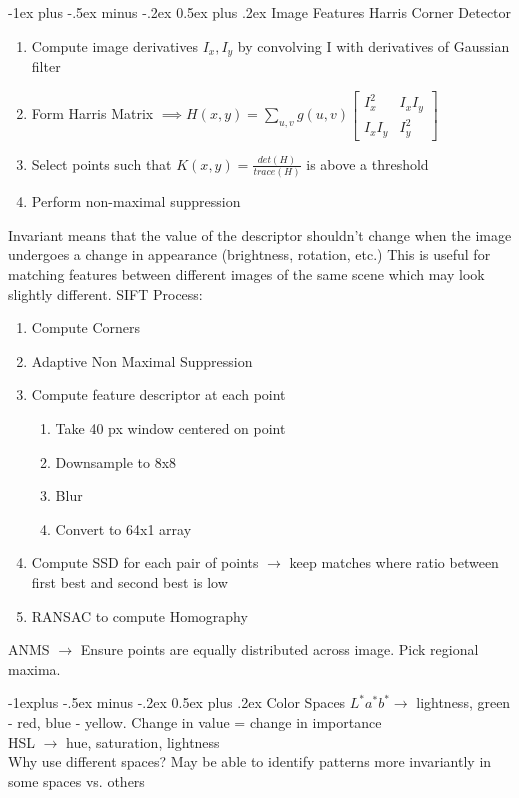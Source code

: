 \documentclass[10pt,landscape]{article}
\makeatletter
\renewcommand{\section}{\@startsection{section}{1}{0mm}%
                                {-1ex plus -.5ex minus -.2ex}%
                                {0.5ex plus .2ex}%
                                {\normalfont\large\bfseries}}
\renewcommand{\subsection}{\@startsection{subsection}{2}{0mm}%
                                {-1explus -.5ex minus -.2ex}%
                                {0.5ex plus .2ex}%
                                {\normalfont\normalsize\bfseries}}
\makeatother
\begin{document}
\begin{multicols}{3}
\section{Image Features}
Harris Corner Detector
\begin{enumerate}
        \item Compute image derivatives $I_x, I_y$ by convolving I with derivatives of Gaussian filter
        \item Form Harris Matrix $\implies H(x,y) = \sum_{u,v} g(u,v) \begin{bmatrix}I_x^2 & I_x I_y \\ I_x I_y & I_y^2\end{bmatrix}$
        \item Select points such that $K(x,y) = \frac{det(H)}{trace(H)}$ is above a threshold
        \item Perform non-maximal suppression
\end{enumerate}
Invariant means that the value of the descriptor shouldn't change when the image undergoes a change in appearance (brightness, rotation, etc.)
This is useful for matching features between different images of the same scene which may look slightly different.
SIFT Process:
\begin{enumerate} 
        \item Compute Corners
        \item Adaptive Non Maximal Suppression
        \item Compute feature descriptor at each point
        \begin{enumerate}
                \item Take 40 px window centered on point
                \item Downsample to 8x8
                \item Blur 
                \item Convert to 64x1 array
        \end{enumerate}
        \item Compute SSD for each pair of points $\rightarrow$ keep matches where ratio between first best and second best is low
        \item RANSAC to compute Homography
\end{enumerate}
ANMS $\rightarrow$ Ensure points are equally distributed across image. Pick regional maxima.

\subsection{Color Spaces}
$L^*a^*b^* \rightarrow$ lightness, green - red, blue - yellow. Change in value = change in importance
\\ HSL $\rightarrow$ hue, saturation, lightness
\\ Why use different spaces? May be able to identify patterns more invariantly in some spaces vs. others



\end{multicols}
\end{document}

